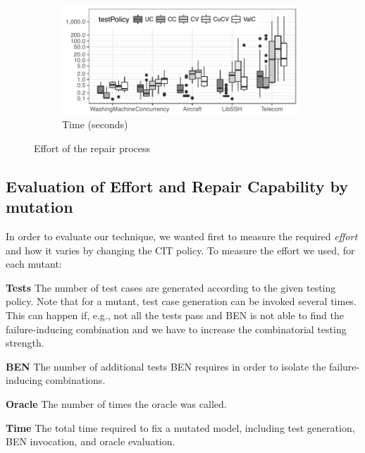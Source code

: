 \begin{tikzborder}{\cite{Gargantini16:validation}}
\begin{tikzborder}{\cite{gargantini_combinatorial_2017}}
\begin{tikzborder}{\cite{gargantini_combinatorial_2017}}
\begin{figure}
\begin{subfigure}[b]{0.74\textwidth}
		\centering
		\includegraphics[width=0.98\textwidth]{data/time.pdf}
		\caption{Time (seconds)}\label{fig:time}
	\end{subfigure}
	\caption{Effort of the repair process}\label{fig:repaireffort}
\end{figure}

\subsection*{Evaluation of Effort and Repair Capability by mutation} 

\bb In order to evaluate our technique,  we wanted first to measure the required \emph{effort} and how it varies by changing the CIT policy. To measure the effort we used, for each mutant:

\begin{compactdesc}
	\newcommand{\Time}{\textbf{Time}\xspace}
	\newcommand{\Ben}{\textbf{BEN}\xspace}
	\newcommand{\Tests}{\textbf{Tests}\xspace}
	\newcommand{\Oracle}{\textbf{Oracle}\xspace}
	\item[\Tests] The number of test cases are generated according to the given testing policy. Note that for a mutant, test case generation can be invoked several times.
	\noindent This can happen if, e.g., not all the tests pass and BEN is not able to find the failure-inducing combination and we have to increase the combinatorial testing strength.
	
	\item[\Ben] The number of additional tests BEN requires in order to isolate the failure-inducing combinations. 
	
	\item[\Oracle] The number of times the oracle was called.
	
	\item[\Time] The total time required to fix a mutated model, including test generation, BEN invocation, and oracle evaluation. 
\end{compactdesc}


\end{tikzborder}
\end{tikzborder}
\end{tikzborder}
